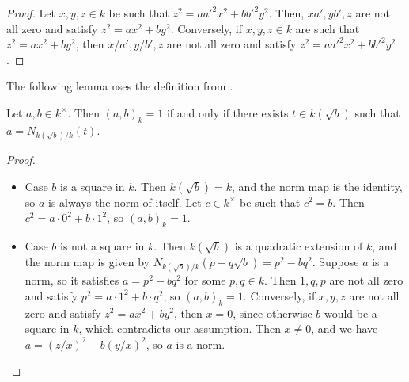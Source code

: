 \begin{proof}
	\leanok
	Let $x, y, z \in k$ be such that $z^2 = a a'^2 x^2 + b b'^2 y^2$. Then, $xa', yb', z$ are not all
	zero and satisfy $z^2 = ax^2 + by^2$. Conversely, if $x, y, z \in k$ are such that
	$z^2 = ax^2 + by^2$, then $x/a', y/b', z$ are not all zero and satisfy
	$z^2 = a a'^2 x^2 + b b'^2 y^2$.
\end{proof}

The following lemma uses the definition  from \mathlib.

\begin{lemma}
	\label{lem:eq_one_iff}
	\leanok
	Let $a, b \in k^\times$. Then $(a, b)_k = 1$ if and only if there exists $t \in k(\sqrt{b})$ such
	that $a = N_{k(\sqrt{b})/k}(t)$.
\end{lemma}

\begin{proof}
	\leanok
	\begin{itemize}
		\item Case $b$ is a square in $k$. Then $k(\sqrt{b}) = k$, and the norm map is the identity, so
		$a$ is always the norm of itself. Let $c \in k^\times$ be such that $c^2 = b$.
		Then $c^2 = a \cdot 0^2 + b \cdot 1^2$, so $(a,b)_k=1$.
		\item Case $b$ is not a square in $k$. Then $k(\sqrt{b})$ is a quadratic extension of $k$, and
		the norm map is given by $N_{k(\sqrt{b})/k}(p + q \sqrt{b}) = p^2 - b q^2$.
		Suppose $a$ is a norm, so it satisfies $a = p^2 - b q^2$ for some $p, q \in k$.
		Then $1, q, p$ are not all zero and satisfy $ p^2 = a \cdot 1^2 + b \cdot q^2$,
		so $(a, b)_k = 1$. Conversely, if $x, y, z$ are not all zero and satisfy $z^2 = ax^2 + by^2$,
		then $x=0$, since otherwise $b$ would be a square in $k$, which contradicts our assumption.
		Then $x \ne 0$, and we have $a = (z/x)^2 - b (y/x)^2$, so $a$ is a norm.
	\end{itemize}
\end{proof}

